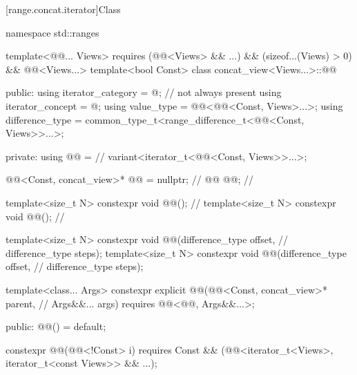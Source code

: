 [range.concat.iterator]{Class }

%
%
\begin{codeblock}
namespace std::ranges {
  template<@@... Views>
    requires (@@<Views> && ...) && (sizeof...(Views) > 0) &&
              @@<Views...>
  template<bool Const>
  class concat_view<Views...>::@@ {

  public:
    using iterator_category = @\seebelow@;                                // not always present
    using iterator_concept = @\seebelow@;
    using value_type = @@<@@<Const, Views>...>;
    using difference_type = common_type_t<range_difference_t<@@<Const, Views>>...>;

  private:
    using @@ =                                                       // \expos
      variant<iterator_t<@@<Const, Views>>...>;

    @@<Const, concat_view>* @@ = nullptr;                     // \expos
    @@ @@;                                                          // \expos

    template<size_t N>
      constexpr void @@();                                             // \expos
    template<size_t N>
      constexpr void @@();                                                // \expos

    template<size_t N>
      constexpr void @@(difference_type offset,                    // \expos
                                 difference_type steps);
    template<size_t N>
      constexpr void @@(difference_type offset,                    // \expos
                                 difference_type steps);

    template<class... Args>
      constexpr explicit @@(@@<Const, concat_view>* parent,  // \expos
                                  Args&&... args)
        requires @@<@@, Args&&...>;

  public:
    @@() = default;

    constexpr @@(@@<!Const> i)
      requires Const && (@@<iterator_t<Views>, iterator_t<const Views>> && ...);

}}
\end{codeblock}
